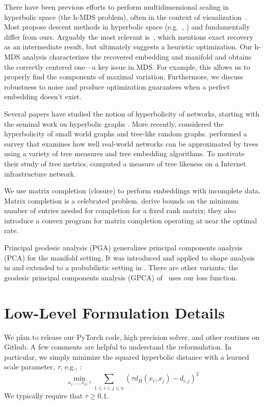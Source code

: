 There have been previous efforts to perform multidimensional scaling in hyperbolic space (the h-MDS problem), often in the context of visualization~\cite{lamping1994laying}. Most propose descent methods in hyperbolic space (e.g.~\cite{cvetkovski2016multidimensional}, \cite{walter2004}) and fundamentally differ from ours.
Arguably the most relevant is~\citet{wilson2014spherical}, which mentions exact recovery as an intermediate result, but ultimately suggests a heuristic optimization.
Our h-MDS analysis characterizes the recovered embedding and manifold and obtains the correctly centered one---a key issue in MDS.
For example, this allows us to properly find the components of maximal variation.
Furthermore, we discuss robustness to noise and produce optimization guarantees when a perfect embedding doesn't exist.

Several papers have studied the notion of hyperbolicity of networks, starting with the seminal work on hyperbolic graphs \citet{Gromov}. More recently, \citet{Mahoney} considered the hyperbolicity of small world graphs and tree-like random graphs. \citet{Dragan} performed a survey that examines how well real-world networks can be approximated by trees using a variety of tree measures and tree embedding algorithms. To motivate their study of tree metrics, \citet{Abraham} computed a measure of tree likeness on a Internet infrastructure network. 

We use matrix completion (closure) to perform embeddings with incomplete data. Matrix completion is a celebrated problem. \citet{TaoMatrix} derive bounds on the minimum number of entries needed for completion for a 
fixed rank matrix; they also introduce a convex program for matrix completion operating at near the optimal rate.

Principal geodesic analysis (PGA) generalizes principal components analysis (PCA) for the manifold setting. It was introduced and applied to shape analysis in \cite{PGA} and extended to a probabilistic setting in \cite{ProbPGA}.
There are other variants; the geodesic principal components analysis (GPCA) of~\citet{GPCA} uses our loss function.



\section{Low-Level Formulation Details}
We plan to release our PyTorch code, high precision solver, and other
routines on Github. A few comments are helpful to understand the
reformulation. In particular, we simply minimize the squared
hyperbolic distance with a learned scale parameter, $\tau$, e.g., :
\[ \min_{x_1,\dots,x_n,\tau}\sum_{1 \leq i < j \leq n} \left(\tau d_{H}(x_i,x_j) - d_{i,j}\right)^2 \]
We typically require that $\tau \geq 0.1$.


